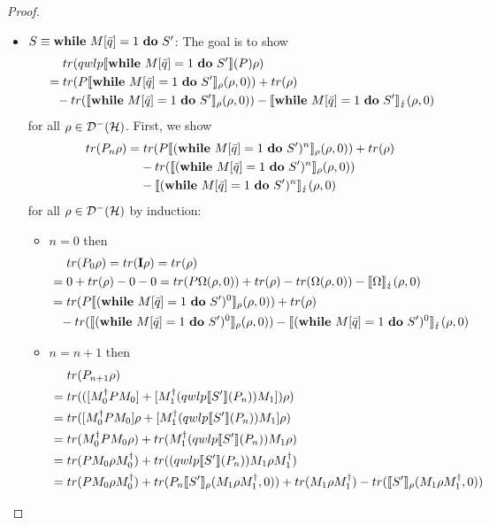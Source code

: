 \documentclass[a4paper,UKenglish,cleveref, autoref, thm-restate]{lipics-v2021}
\begin{document}
\begin{proof}
\begin{itemize}
        \item $S\equiv \mathbf{while } \text{ }M[\Bar{q}]=1 \text{ }\mathbf{ do } \text{ }S' $:
        The goal is to show
        \begin{align*}
            &\phantom{=.}tr(qwlp\llbracket \mathbf{while } \text{ }M[\Bar{q}]=1 \text{ }\mathbf{ do } \text{ }S' \rrbracket (P)\rho)\\
            &= tr(P \llbracket \mathbf{while } \text{ }M[\Bar{q}]=1 \text{ }\mathbf{ do } \text{ }S' \rrbracket_{\rho}(\rho,0)) + tr(\rho)\\
            &\phantom{=}-tr(\llbracket \mathbf{while } \text{ }M[\Bar{q}]=1 \text{ }\mathbf{ do } \text{ }S' \rrbracket_{\rho}(\rho,0))- \llbracket \mathbf{while } \text{ }M[\Bar{q}]=1 \text{ }\mathbf{ do } \text{ }S' \rrbracket_{\lightning}(\rho,0)
        \end{align*}
        for all $\rho \in \mathcal{D}^- (\mathcal{H})$. First, we show
        \begin{align*}
            &tr(P_n \rho) = tr(P \llbracket (\mathbf{while } \text{ }M[\Bar{q}]=1 \text{ }\mathbf{ do } \text{ }S')^n \rrbracket_{\rho}(\rho,0))+ tr(\rho)\\
            &\phantom{tr(P_n \rho) = }-tr(\llbracket (\mathbf{while } \text{ }M[\Bar{q}]=1 \text{ }\mathbf{ do } \text{ }S')^n \rrbracket_{\rho}(\rho,0))\\
            & \phantom{tr(P_n \rho) = }- \llbracket (\mathbf{while } \text{ }M[\Bar{q}]=1 \text{ }\mathbf{ do } \text{ }S')^n \rrbracket_{\lightning}(\rho,0)
        \end{align*}
        for all $\rho \in \mathcal{D}^- (\mathcal{H})$ by induction:
        \begin{itemize}
            \item $n=0$ then
            \begin{align*}
                &\phantom{=.} tr(P_0 \rho) = tr(\textbf{I} \rho) = tr(\rho) \\
                &= 0 + tr(\rho) - 0 - 0= tr(P \Omega(\rho,0)) + tr(\rho) - tr(\Omega(\rho,0)) - \llbracket \Omega \rrbracket_{\lightning}(\rho,0) \\
                &= tr(P \llbracket (\mathbf{while } \text{ }M[\Bar{q}]=1 \text{ }\mathbf{ do } \text{ }S')^0 \rrbracket_{\rho}(\rho,0))+ tr(\rho) \\
                &\phantom{=} - tr(\llbracket (\mathbf{while } \text{ }M[\Bar{q}]=1 \text{ }\mathbf{ do } \text{ }S')^0 \rrbracket_{\rho}(\rho,0))- \llbracket (\mathbf{while } \text{ }M[\Bar{q}]=1 \text{ }\mathbf{ do } \text{ }S')^0 \rrbracket_{\lightning}(\rho,0)
            \end{align*}
            \item $n=n+1$ then
            \begin{align*}
                &\phantom{=.}tr(P_{n+1} \rho)\\
                &=  tr (([M_0^\dagger P  M_0] + [M_1^\dagger(\qwlp{S'}{P_n}) M_1]) \rho)\\
                &= tr([M_0^\dagger P  M_0]\rho  + [M_1^\dagger(\qwlp{S'}{P_n}) M_1] \rho)\\
                &=  tr(M_0^\dagger P  M_0 \rho) + tr(M_1^\dagger(\qwlp{S'}{P_n}) M_1 \rho)\\
                &=  tr( P  M_0 \rho M_0^\dagger) + tr((\qwlp{S'}{P_n}) M_1 \rho M_1^\dagger)\\
                &= tr( P  M_0 \rho M_0^\dagger) + tr(P_n \semanticsRho{S'}(M_1 \rho M_1^\dagger,0)) + tr(M_1 \rho M_1^\dagger)-tr(\semanticsRho{S'}(M_1 \rho M_1^\dagger,0))\\

\end{align*}
\end{itemize}
\end{itemize}
\end{proof}
\end{document}
